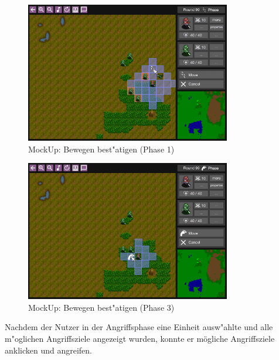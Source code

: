 \documentclass[12pt, titlepage]{scrartcl}
\newcounter{subsubsubsection}[subsubsection]
\begin{document}
                    \begin{figure}[H] 
                    	\centering
                    	\includegraphics[width=0.8\textwidth]{images/mockUps/ConfirmMove.png}
                    	\caption{MockUp: Bewegen best"atigen (Phase 1)}
                    	\label{Move}
                    \end{figure}
	                \begin{figure}[H] 
	                	\centering
	                	\includegraphics[width=0.8\textwidth]{images/mockUps/ConfirmMove2.png}
	                	\caption{MockUp: Bewegen best"atigen (Phase 3)}
	                	\label{Move2}
	                \end{figure}
			        Nachdem der Nutzer in der Angriffsphase eine Einheit ausw"ahlte und alle m"oglichen Angriffsziele angezeigt wurden, konnte er m\"ogliche Angriffsziele anklicken und angreifen. \\
\end{document}

